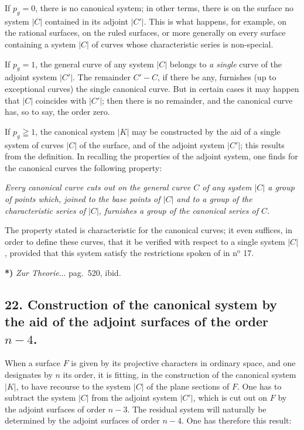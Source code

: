 \documentclass{article}
\begin{document}
If $p_{g} = 0$, there is no canonical system; in other terms, there is on the surface no system $|C|$ contained in its adjoint $|C'|$. This is what happens, for example, on the rational surfaces, on the ruled surfaces, or more generally on every surface containing a system $|C|$ of curves whose characteristic series is non-special.

If $p_{g} = 1$, the general curve of any system $|C|$ belongs to \emph{a single} curve of the adjoint system $|C'|$. The remainder $C' - C$, if there be any, furnishes (up to exceptional curves) the single canonical curve. But in certain cases it may happen that $|C|$ coincides with $|C'|$; then there is no remainder, and the canonical curve has, so to say, the order zero.

If $p_{g} \geqq 1$, the canonical system $|K|$ may be constructed by the aid of a single system of curves $|C|$ of the surface, and of the adjoint system $|C'|$; this results from the definition. In recalling the properties of the adjoint system, one finds for the canonical curves the following property:

\emph{Every canonical curve cuts out on the general curve $C$ of any system $|C|$ a group of points which, joined to the base points of $|C|$ and to a group of the characteristic series of $|C|$, furnishes a group of the canonical series of $C$.}

The property stated is characteristic for the canonical curves; it even suffices, in order to define these curves, that it be verified with respect to a single system $|C|$, provided that this system satisfy the restrictions spoken of in n${}^{\text{o}}$ 17.

\textbf{*)} \emph{Zur Theorie}... pag.\ 520, ibid.


\subsection*{22. Construction of the canonical system by the aid of the adjoint surfaces of the order $n-4$.}

When a surface $F$ is given by its projective characters in ordinary space, and one designates by $n$ its order, it is fitting, in the construction of the canonical system $|K|$, to have recourse to the system $|C|$ of the plane sections of $F$. One has to subtract the system $|C|$ from the adjoint system $|C'|$, which is cut out on $F$ by the adjoint surfaces of order $n-3$. The residual system will naturally be determined by the adjoint surfaces of order $n-4$. One has therefore this result:
\end{document}

